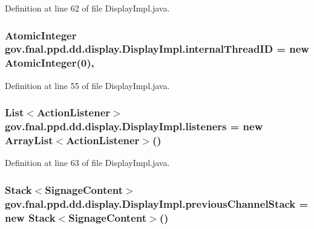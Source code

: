 Definition at line 62 of file Display\-Impl.\-java.

\hypertarget{classgov_1_1fnal_1_1ppd_1_1dd_1_1display_1_1DisplayImpl_ad88d25a9ab5f40882542b19846f83bf3}{
\subsubsection[{internal\-Thread\-I\-D}]{\setlength{\rightskip}{0pt plus 5cm}Atomic\-Integer gov.\-fnal.\-ppd.\-dd.\-display.\-Display\-Impl.\-internal\-Thread\-I\-D = new Atomic\-Integer(0)\hspace{0.3cm}{\ttfamily [static]}, {\ttfamily [protected]}}}\label{classgov_1_1fnal_1_1ppd_1_1dd_1_1display_1_1DisplayImpl_ad88d25a9ab5f40882542b19846f83bf3}


Definition at line 55 of file Display\-Impl.\-java.

\hypertarget{classgov_1_1fnal_1_1ppd_1_1dd_1_1display_1_1DisplayImpl_aa4a7dad0a486d2f888cf47921423e2c1}{
\subsubsection[{listeners}]{\setlength{\rightskip}{0pt plus 5cm}List$<$Action\-Listener$>$ gov.\-fnal.\-ppd.\-dd.\-display.\-Display\-Impl.\-listeners = new Array\-List$<$Action\-Listener$>$()\hspace{0.3cm}{\ttfamily [protected]}}}\label{classgov_1_1fnal_1_1ppd_1_1dd_1_1display_1_1DisplayImpl_aa4a7dad0a486d2f888cf47921423e2c1}


Definition at line 63 of file Display\-Impl.\-java.

\hypertarget{classgov_1_1fnal_1_1ppd_1_1dd_1_1display_1_1DisplayImpl_a1732d577755dfc58b9762a41599fa4ed}{
\subsubsection[{previous\-Channel\-Stack}]{\setlength{\rightskip}{0pt plus 5cm}Stack$<${\bf Signage\-Content}$>$ gov.\-fnal.\-ppd.\-dd.\-display.\-Display\-Impl.\-previous\-Channel\-Stack = new Stack$<${\bf Signage\-Content}$>$()\hspace{0.3cm}{\ttfamily [protected]}}}\label{classgov_1_1fnal_1_1ppd_1_1dd_1_1display_1_1DisplayImpl_a1732d577755dfc58b9762a41599fa4ed}


